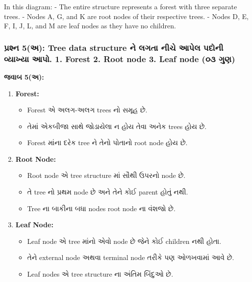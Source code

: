 In this diagram: - The entire structure represents a forest with three
separate trees. - Nodes A, G, and K are root nodes of their respective
trees. - Nodes D, E, F, I, J, L, and M are leaf nodes as they have no
children.

\hypertarget{uxaaauxab0uxab6uxaa8-5uxa85-tree-data-structure-uxaa8-uxab2uxa97uxaa4-uxaa8uxa9a-uxa86uxaaauxab2-uxaaauxaa6uxaa8-uxab5uxaafuxa96uxaaf-uxa86uxaaa.-1.-forest-2.-root-node-3.-leaf-node-uxae6uxae9-uxa97uxaa3}{%
\subsubsection{પ્રશ્ન 5(અ): Tree data structure ને લગતા નીચે આપેલ પદોની
વ્યાખ્યા આપો. 1. Forest 2. Root node 3. Leaf node (૦૩
ગુણ)}\label{uxaaauxab0uxab6uxaa8-5uxa85-tree-data-structure-uxaa8-uxab2uxa97uxaa4-uxaa8uxa9a-uxa86uxaaauxab2-uxaaauxaa6uxaa8-uxab5uxaafuxa96uxaaf-uxa86uxaaa.-1.-forest-2.-root-node-3.-leaf-node-uxae6uxae9-uxa97uxaa3}}

\textbf{જવાબ 5(અ):}

\begin{enumerate}
\def\labelenumi{\arabic{enumi}.}
\tightlist
\item
  \textbf{Forest:}

  \begin{itemize}
  \tightlist
  \item
    Forest એ અલગ-અલગ trees નો સમૂહ છે.
  \item
    તેમાં એકબીજા સાથે જોડાયેલા ન હોય તેવા અનેક trees હોય છે.
  \item
    Forest માંના દરેક tree ને તેનો પોતાનો root node હોય છે.
  \end{itemize}
\item
  \textbf{Root Node:}

  \begin{itemize}
  \tightlist
  \item
    Root node એ tree structure માં સૌથી ઉપરનો node છે.
  \item
    તે tree નો પ્રથમ node છે અને તેને કોઈ parent હોતું નથી.
  \item
    Tree ના બાકીના બધા nodes root node ના વંશજો છે.
  \end{itemize}
\item
  \textbf{Leaf Node:}

  \begin{itemize}
  \tightlist
  \item
    Leaf node એ tree માંનો એવો node છે જેને કોઈ children નથી હોતા.
  \item
    તેને external node અથવા terminal node તરીકે પણ ઓળખવામાં આવે છે.
  \item
    Leaf nodes એ tree structure ના અંતિમ બિંદુઓ છે.
  \end{itemize}
\end{enumerate}

